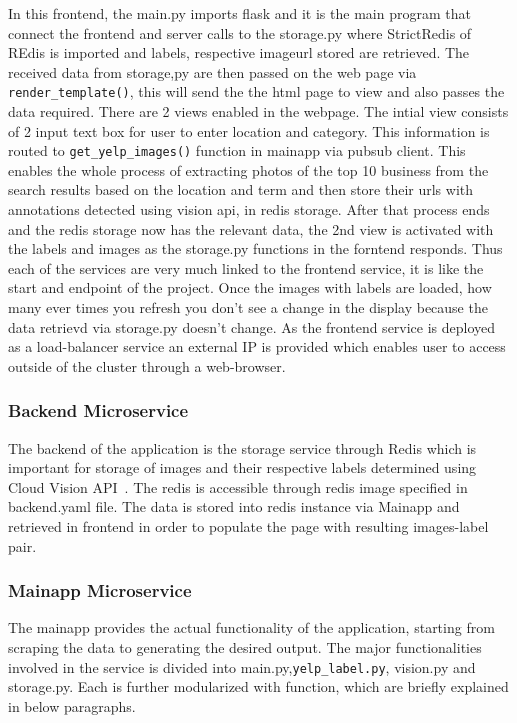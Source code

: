 In this frontend, the main.py imports flask and it is the main program
that connect the frontend and server calls to the storage.py where
StrictRedis of REdis is imported and labels, respective imageurl
stored are retrieved. The received data from storage,py are then
passed on the web page via \verb|render_template()|, this will send
the the html page to view and also passes the data required. There are
2 views enabled in the webpage. The intial view consists of 2 input
text box for user to enter location and category. This information is
routed to \verb|get_yelp_images()| function in mainapp via pubsub
client. This enables the whole process of extracting photos of the top
10 business from the search results based on the location and term and
then store their urls with annotations detected using vision api, in
redis storage. After that process ends and the redis storage now has
the relevant data, the 2nd view is activated with the labels and
images as the storage.py functions in the forntend responds. Thus each
of the services are very much linked to the frontend service, it is
like the start and endpoint of the project. Once the images with
labels are loaded, how many ever times you refresh you don't see a
change in the display because the data retrievd via storage.py doesn't
change.  As the frontend service is deployed as a load-balancer
service an external IP is provided which enables user to access
outside of the cluster through a web-browser.

\subsubsection{Backend Microservice} 

The backend of the application is the storage service through Redis
which is important for storage of images and their respective labels
determined using Cloud Vision API~\cite{hid-sp18-602-redis}. The redis
is accessible through redis image specified in backend.yaml file. The
data is stored into redis instance via Mainapp and retrieved in
frontend in order to populate the page with resulting images-label
pair.

\subsubsection{Mainapp Microservice}

The mainapp provides the actual functionality of the application,
starting from scraping the data to generating the desired output. The
major functionalities involved in the service is divided into
main.py,\verb|yelp_label.py|, vision.py and storage.py. Each is
further modularized with function, which are briefly explained in
below paragraphs.

